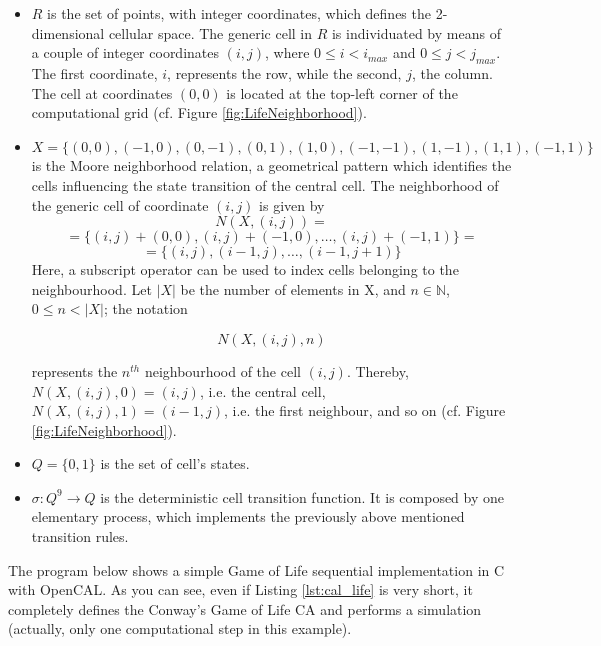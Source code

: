 \begin{itemize}

\item $R$ is the set of points, with integer coordinates, which
  defines the 2-dimensional cellular space. The generic cell in $R$ is
  individuated by means of a couple of integer coordinates $(i, j)$,
  where $0 \leq i < i_{max}$ and $0 \leq j < j_{max}$. The first
  coordinate, $i$, represents the row, while the second, $j$, the
  column. The cell at coordinates $(0,0)$ is located at the top-left
  corner of the computational grid (cf. Figure
  \ref{fig:LifeNeighborhood}).

\item $X = \{(0,0), (-1, 0), (0, -1), (0, 1), (1, 0), (-1,-1), (1,-1),
  (1,1), (-1,1)\}$ is the Moore neighborhood relation, a geometrical
  pattern which identifies the cells influencing the state transition
  of the central cell. The neighborhood of the generic cell of
  coordinate $(i, j)$ is given by
  $$N(X, (i, j)) = $$
  $$= \{(i, j)+(0,0), (i, j)+(-1, 0), \dots, (i, j)+(-1,1)\} =$$
  $$= \{(i, j), (i-1, j), \dots, (i-1,j+1)\}$$
  Here, a subscript operator can be used to index cells belonging to the
  neighbourhood. Let $|X|$ be the number of elements in X, and $n \in
  \mathbb{N}$, $0 \leq n < |X|$; the notation

  $$N(X, (i, j), n)$$

  represents the $n^{th}$ neighbourhood of the cell $(i,j)$. Thereby,
  $N(X, (i, j), 0) = (i, j)$, i.e. the central cell, $N(X, (i, j), 1)
  = (i-1, j)$, i.e. the first neighbour, and so on (cf. Figure
  \ref{fig:LifeNeighborhood}).
  
\item $Q = \{0, 1\}$ is the set of cell's states.
  
\item $\sigma : Q^9 \rightarrow Q$ is the deterministic cell
  transition function. It is composed by one elementary process, which
  implements the previously above mentioned transition rules.
\end{itemize}


The program below shows a simple Game of Life sequential
implementation in C with OpenCAL. As you can see, even if Listing
\ref{lst:cal_life} is very short, it completely defines the Conway's
Game of Life CA and performs a simulation (actually, only one
computational step in this example).




